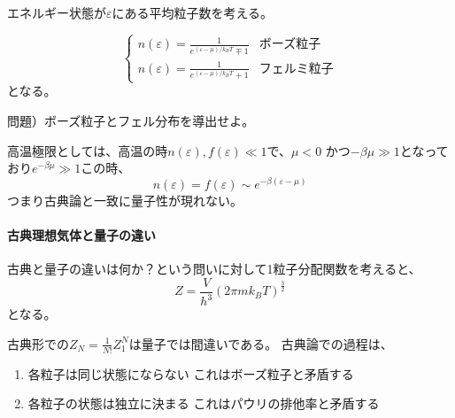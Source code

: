 \documentclass[titlepage]{ltjsarticle}
\begin{document}
エネルギー状態が\(\varepsilon\)にある平均粒子数を考える。

\begin{equation}
  \begin{cases}
    n(\varepsilon)  =  \frac{1}{e^{(\varepsilon-\mu)/k_BT} \mp 1} & \text{ボーズ粒子} \\
    n(\varepsilon)  =  \frac{1}{e^{(\varepsilon-\mu)/k_BT} + 1} & \text{フェルミ粒子}
  \end{cases}
\end{equation}
となる。

問題）ボーズ粒子とフェル分布を導出せよ。

高温極限としては、高温の時\(n(\varepsilon),f(\varepsilon)\ll 1\)で、\(\mu<0\) かつ\(-\beta \mu \gg 1\)となっており\(e^{-\beta \mu} \gg 1\)この時、
\begin{equation}
  n(\varepsilon) = f(\varepsilon) \sim e^{-\beta(\varepsilon-\mu)}
\end{equation}
つまり古典論と一致に量子性が現れない。

\paragraph{古典理想気体と量子の違い}
古典と量子の違いは何か？という問いに対して1粒子分配関数を考えると、
\begin{equation}
  Z = \frac{V}{h^3} (2 \pi mk_BT)^{\frac{3}{2}}
\end{equation}
となる。

古典形での\(Z_N = \frac{1}{N!}Z_1^N\)は量子では間違いである。
古典論での過程は、
\begin{enumerate}
  \item 各粒子は同じ状態にならない これはボーズ粒子と矛盾する
  \item 各粒子の状態は独立に決まる これはパウリの排他率と矛盾する
\end{enumerate}
\end{document}
